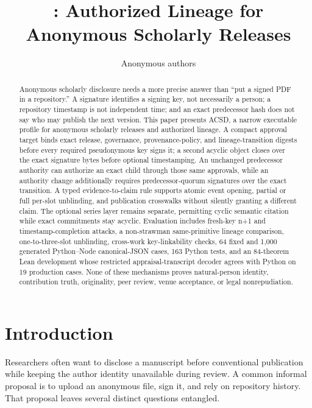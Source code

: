 \documentclass[11pt]{article}
\title{\acsd: Authorized Lineage for Anonymous Scholarly Releases}
\author{Anonymous authors}
\date{}
\newcommand{\acsd}{\textsc{ACSD}}
\begin{document}
\maketitle

\begin{abstract}
Anonymous scholarly disclosure needs a more precise answer than ``put a signed PDF in a repository.'' A signature identifies a signing key, not necessarily a person; a repository timestamp is not independent time; and an exact predecessor hash does not say who may publish the next version. This paper presents \acsd, a narrow executable profile for anonymous scholarly releases and authorized lineage. A compact approval target binds exact release, governance, provenance-policy, and lineage-transition digests before every required pseudonymous key signs it; a second acyclic object closes over the exact signature bytes before optional timestamping. An unchanged predecessor authority can authorize an exact child through those same approvals, while an authority change additionally requires predecessor-quorum signatures over the exact transition. A typed evidence-to-claim rule supports atomic event opening, partial or full per-slot unblinding, and publication crosswalks without silently granting a different claim. The optional series layer remains separate, permitting cyclic semantic citation while exact commitments stay acyclic. Evaluation includes fresh-key n+1 and timestamp-completion attacks, a non-strawman same-primitive lineage comparison, one-to-three-slot unblinding, cross-work key-linkability checks, 64 fixed and 1,000 generated Python--Node canonical-JSON cases, 163 Python tests, and an 84-theorem Lean development whose restricted appraisal-transcript decoder agrees with Python on 19 production cases. None of these mechanisms proves natural-person identity, contribution truth, originality, peer review, venue acceptance, or legal nonrepudiation.
\end{abstract}

\section{Introduction}

Researchers often want to disclose a manuscript before conventional publication while keeping the author identity unavailable during review. A common informal proposal is to upload an anonymous file, sign it, and rely on repository history. That proposal leaves several distinct questions entangled.
\end{document}
